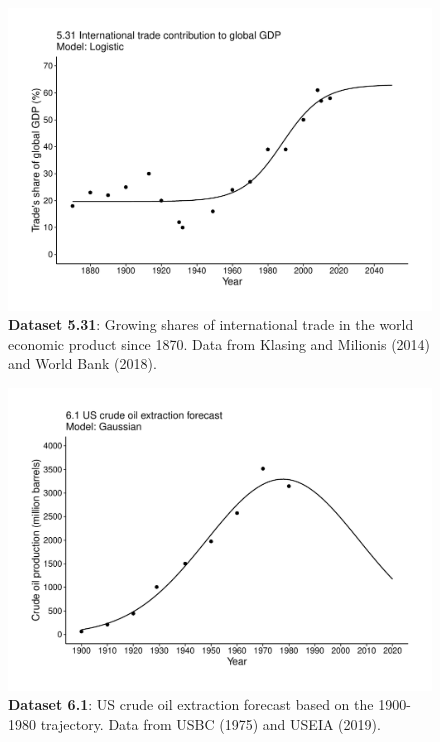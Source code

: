 \documentclass[aps,rmp,preprint,superscriptaddress,10pt,onecolumn]{article}
\begin{document}
\clearpage
\begin{figure}[h]
\includegraphics[width=\textwidth]{output/figs-ggplot/5.31.pdf}
\caption{\textbf{Dataset 5.31}: Growing shares of international trade in the world economic product since 1870. Data from Klasing and Milionis (2014) and World Bank (2018).}
\end{figure}
	
\clearpage
\begin{figure}[h]
\includegraphics[width=\textwidth]{output/figs-ggplot/6.1.pdf}
\caption{\textbf{Dataset 6.1}: US crude oil extraction forecast based on the 1900-1980 trajectory. Data from USBC (1975) and USEIA (2019). }
\end{figure}
	
\end{document}
